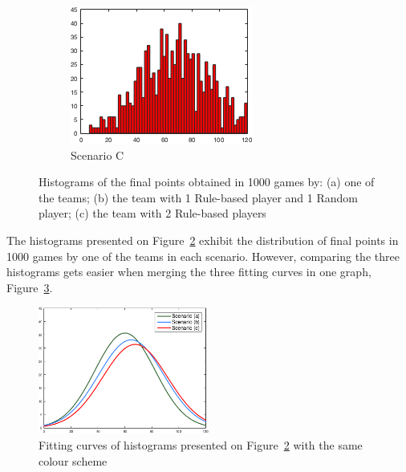 \begin{figure}[h]
\begin{subfigure}[h]{0.32\textwidth}
                \includegraphics[width=\textwidth]{./img/5/HC-2RuleBased_2Random}
                \caption{Scenario C}
                \label{fig:histogramC}
        \end{subfigure}
        \caption[Histograms of the final points obtained in the 3 scenarios]{Histograms of the final points obtained in 1000 games by: (a) one of the teams; (b) the team with 1 Rule-based player and 1 Random player; (c) the team with 2 Rule-based players}
        \label{fig:histograms}
\end{figure}

The histograms presented on Figure~\ref{fig:histograms} exhibit the distribution of final points in 1000 games by one of the teams in each scenario.
However, comparing the three histograms gets easier when merging the three fitting curves in one graph, Figure~\ref{fig:fitHistABC}.

\begin{figure}[h!]
  \centering
    \includegraphics[width=0.5\textwidth]{./img/5/FitHistABC}
  \caption{Fitting curves of histograms presented on Figure~\ref{fig:histograms} with the same colour scheme}
\label{fig:fitHistABC}
\end{figure}

